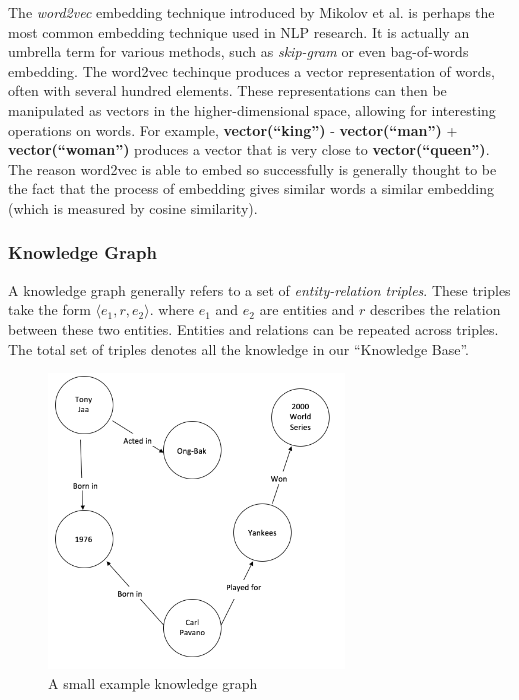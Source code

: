 \documentclass[pageno]{jpaper}
\begin{document}
The \textit{word2vec} embedding technique introduced by Mikolov et al.
\cite{Mikolov2013} is perhaps the most common embedding technique used in NLP
research. It is actually an umbrella term for various methods, such as
\textit{skip-gram} or even bag-of-words embedding. The word2vec techinque
produces a vector representation of words, often with several hundred elements.
These representations can then be manipulated as vectors in the
higher-dimensional space, allowing for interesting operations on words. For
example, \textbf{vector(``king'')} - \textbf{vector(``man'')} +
\textbf{vector(``woman'')} produces a vector that is very close to
\textbf{vector(``queen'')}. The reason word2vec is able to embed so successfully
is generally thought to be the fact that the process of embedding gives similar
words a similar embedding (which is measured by cosine similarity). \\

\subsubsection{Knowledge Graph}
\label{Knowledge Graph}

A knowledge graph generally refers to a set of \textit{entity-relation triples}.
These triples take the form $\langle e_1, r, e_2 \rangle$. where $e_1$ and $e_2$
are entities and $r$ describes the relation between these two entities. Entities
and relations can be repeated across triples. The total set of triples denotes
all the knowledge in our ``Knowledge Base''.

\begin{figure}[!tb]
    \centering
    \includegraphics[width=0.7\textwidth,keepaspectratio]{figures/Example_KG.png}
    \caption{A small example knowledge graph}
    \label{fig: KG}
\end{figure}
\end{document}

